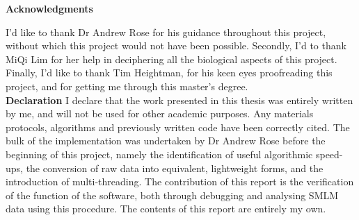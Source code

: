\textbf{Acknowledgments}

I'd like to thank Dr Andrew Rose for his guidance throughout this project, without which this project would not have been possible. Secondly, I'd to thank MiQi Lim for her help in deciphering all the biological aspects of this project. Finally, I'd like to thank Tim Heightman, for his keen eyes proofreading this project, and for getting me through this master's degree.\\

\textbf{Declaration}
I declare that the work presented in this thesis was entirely written by me, and will not be used for other academic purposes. Any materials protocols, algorithms and previously written code have been correctly cited. The bulk of the implementation was undertaken by Dr Andrew Rose before the beginning of this project, namely the identification of useful algorithmic speed-ups, the conversion of raw data into equivalent, lightweight forms, and the introduction of multi-threading. The contribution of this report is the verification of the function of the software, both through debugging and analysing SMLM data using this procedure. 
The contents of this report are entirely my own.
